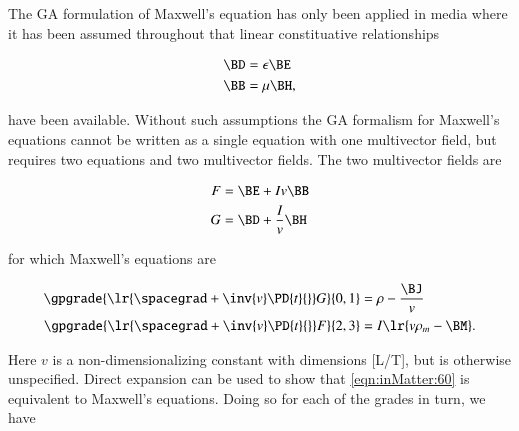 %
%
The GA formulation of Maxwell's equation has only been applied in media where it has been assumed throughout that linear constituative relationships

\begin{dmath}\label{eqn:inMatter:20}
\begin{aligned}
\BD &= \epsilon \BE \\
\BB &= \mu \BH,
\end{aligned}
\end{dmath}

have been available.  Without such assumptions the GA formalism for Maxwell's equations cannot be written as a single equation with one multivector field, but requires two equations and two multivector fields.  The two multivector fields are

\begin{dmath}\label{eqn:inMatter:40}
\begin{aligned}
F &= \BE + I v \BB \\
G &= \BD + \frac{I}{v} \BH
\end{aligned}
\end{dmath}

for which Maxwell's equations are

\begin{dmath}\label{eqn:inMatter:60}
\begin{aligned}
\gpgrade{ \lr{ \spacegrad + \inv{v} \PD{t}{} } G }{0,1} &= \rho - \frac{\BJ}{v} \\
\gpgrade{ \lr{ \spacegrad + \inv{v} \PD{t}{} } F }{2,3} &= I \lr{ v \rho_m - \BM }.
\end{aligned}
\end{dmath}

Here \( v \) is a non-dimensionalizing constant with dimensions [L/T], but is otherwise unspecified.
Direct expansion can be used to show that \cref{eqn:inMatter:60} is equivalent to Maxwell's equations.
Doing so for each of the grades in turn, we have

